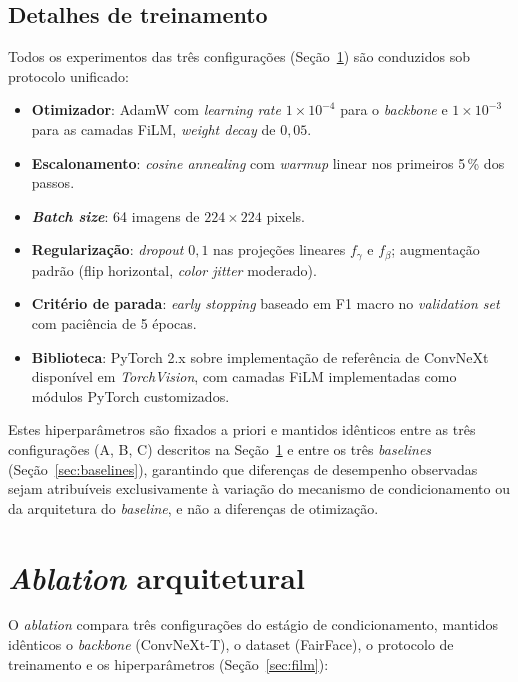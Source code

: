 \subsection{Detalhes de treinamento}

Todos os experimentos das três configurações (Seção~\ref{sec:ablation}) são conduzidos sob protocolo unificado:

\begin{itemize}
\item \textbf{Otimizador}: AdamW com \emph{learning rate} $1 \times 10^{-4}$ para o \emph{backbone} e $1 \times 10^{-3}$ para as camadas FiLM, \emph{weight decay} de $0{,}05$.
\item \textbf{Escalonamento}: \emph{cosine annealing} com \emph{warmup} linear nos primeiros 5\,\% dos passos.
\item \textbf{\emph{Batch size}}: 64 imagens de $224 \times 224$ pixels.
\item \textbf{Regularização}: \emph{dropout} $0{,}1$ nas projeções lineares $f_\gamma$ e $f_\beta$; augmentação padrão (flip horizontal, \emph{color jitter} moderado).
\item \textbf{Critério de parada}: \emph{early stopping} baseado em F1 macro no \emph{validation set} com paciência de 5 épocas.
\item \textbf{Biblioteca}: PyTorch 2.x sobre implementação de referência de ConvNeXt disponível em \emph{TorchVision}, com camadas FiLM implementadas como módulos PyTorch customizados.
\end{itemize}

Estes hiperparâmetros são fixados a priori e mantidos idênticos entre as três configurações (A, B, C) descritos na Seção~\ref{sec:ablation} e entre os três \emph{baselines} (Seção~\ref{sec:baselines}), garantindo que diferenças de desempenho observadas sejam atribuíveis exclusivamente à variação do mecanismo de condicionamento ou da arquitetura do \emph{baseline}, e não a diferenças de otimização.


\section{\emph{Ablation} arquitetural}
\label{sec:ablation}

O \emph{ablation} compara três configurações do estágio de condicionamento, mantidos idênticos o \emph{backbone} (ConvNeXt-T), o dataset (FairFace), o protocolo de treinamento e os hiperparâmetros (Seção~\ref{sec:film}):

